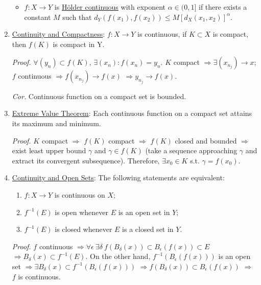 \documentclass[%
 aip,
 jmp,%
 amsmath,amssymb,
 reprint,%
]{revtex4-1}
\def\a{\alpha}
\def\d{\delta}
\def\e{\epsilon}
\renewenvironment{proof}{\color{gray}\footnotesize\emph{Proof.}}{}
\newcommand{\imply}{\Rightarrow}
\newcommand{\defn}[1]{\underline{#1}}
\begin{document}
\begin{enumerate}
\begin{itemize}
        \item $f:X \to Y$ is \defn{H\"older continuous} with exponent $\a\in (0,1]$
        if there exists a constant $M$ such that
        $d_Y(f(x_1),f(x_2)) \leq M \left[d_X(x_1, x_2)\right]^{\a}$.
      \end{itemize}

  \item \defn{Continuity and Compactness}:  $f: X \to Y$ is continuous,
  if $K \subset X$ is compact, then $f(K)$ is compact in Y.

      \begin{proof}
        $\forall (y_n) \subset f(K)$, $\exists (x_n): f(x_n)=y_n$.
        $K$ compact $\imply \exists (x_{n_j}) \to x$;
        $f$ continuous $\imply f(x_{n_j}) \to f(x)$ $\imply y_{n_j} \to f(x)$.
      \end{proof}

      \emph{Cor.} Continuous function on a compact set is bounded.


  \item \defn{Extreme Value Theorem}: Each continuous function on a compact
  set attains its maximum and minimum.

      \begin{proof}
        $K$ compact $\imply$ $f(K)$ compact $\imply$ $f(K)$ closed and bounded
        $\imply$ exist least upper bound $\gamma$ and $\gamma \in f(K)$
        (take a sequence approaching $\gamma$ and extract its convergent
        subsequence). Therefore, $\exists x_0 \in K$ s.t. $\gamma=f(x_0)$.
      \end{proof}

  \item \defn{Continuity and Open Sets}: The following statements are equivalent:
      \begin{enumerate}
        \item $f: X \to Y$ is continuous on $X$;
        \item $f^{-1}(E)$ is open whenever $E$ is an open set in $Y$;
        \item $f^{-1}(E)$ is closed whenever $E$ is a closed set in $Y$.
      \end{enumerate}
      \begin{proof}
        $f$ continuous $\imply \forall\e\ \exists\d\ f(B_{\d}(x)) \subset B_{\e}(f(x)) \subset E$
        $\imply B_{\d}(x) \subset f^{-1}(E)$.
        On the other hand, $f^{-1}(B_{\e}(f(x)))$ is an open set
        $\imply \exists B_{\d}(x) \subset f^{-1}(B_{\e}(f(x)))$
        $\imply f(B_{\d}(x)) \subset B_{\e}(f(x))$ $\imply$ $f$ is continuous.
      \end{proof}


\end{enumerate}
\end{document}
